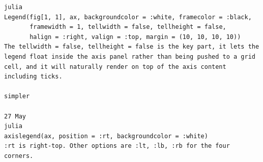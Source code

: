 \documentclass[a4paper,12pt]{article}
\begin{document}
\begin{lstlisting}
julia
Legend(fig[1, 1], ax, backgroundcolor = :white, framecolor = :black,
       framewidth = 1, tellwidth = false, tellheight = false,
       halign = :right, valign = :top, margin = (10, 10, 10, 10))
The tellwidth = false, tellheight = false is the key part, it lets the legend float inside the axis panel rather than being pushed to a grid cell, and it will naturally render on top of the axis content including ticks.

simpler

27 May
julia
axislegend(ax, position = :rt, backgroundcolor = :white)
:rt is right-top. Other options are :lt, :lb, :rb for the four corners.

\end{lstlisting}
\end{document}
